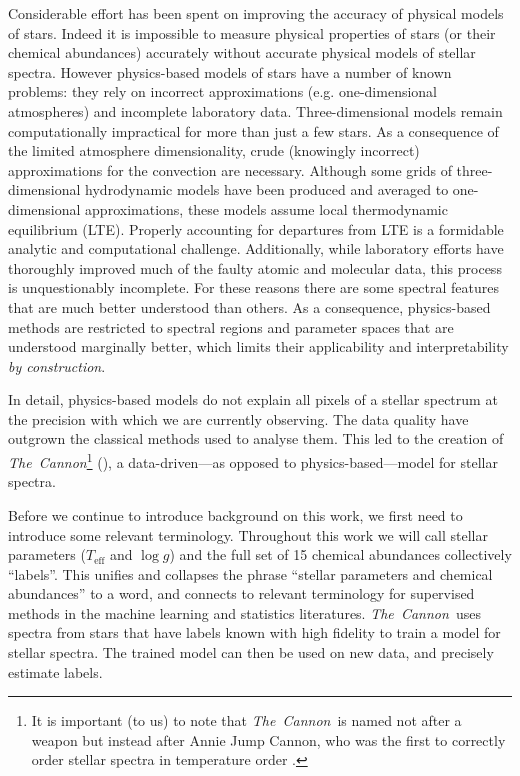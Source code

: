 \documentclass[12pt,preprint]{aastex}
\newcommand{\project}[1]{\textsl{#1}}
\newcommand{\TheCannon}{\project{The~Cannon}}
\newcommand{\logg}{\log g}
\newcommand{\Teff}{T_{\mathrm{eff}}}
\begin{document}
Considerable effort has  been spent on improving the accuracy of physical
models of stars.  Indeed it is impossible to measure physical properties of stars (or 
their chemical abundances) accurately without accurate physical models of 
stellar spectra.  However physics-based models of stars have a number of known
problems: they rely on incorrect approximations (e.g. one-dimensional atmospheres) and incomplete laboratory data.
Three-dimensional models remain computationally impractical for more than just a
few stars.  As a consequence of the limited atmosphere dimensionality, crude 
(knowingly incorrect) approximations for the convection are 
necessary.  Although some grids of three-dimensional hydrodynamic models have been 
produced and averaged to one-dimensional approximations, these models assume 
local thermodynamic equilibrium (LTE).  Properly accounting for departures from 
LTE is a formidable analytic and computational challenge.  Additionally, while 
laboratory efforts have thoroughly improved much of the faulty atomic and 
molecular data, this process is unquestionably incomplete.  For these reasons 
there are some spectral features that are much better understood than others.  
As a consequence, physics-based methods are restricted to spectral regions and
parameter spaces that are understood marginally better, which limits 
their applicability and interpretability \emph{by construction}.


In detail, physics-based models do not explain all pixels of a stellar 
spectrum at the precision with which we are currently observing.  The data
quality have outgrown the classical methods used to analyse them.  This led to the creation of
\TheCannon\footnote{It is important (to us) to note that \TheCannon\ is named 
not after a weapon but instead after Annie Jump Cannon, who was the first to 
correctly order stellar spectra in temperature order \citep[and who did
so by looking at the data, and without any use of physics-based models, see, e.g.,][]
{Cannon_1912}.} (\citealt{tc}), a data-driven---as opposed to 
physics-based---model for stellar spectra. 


Before we continue to introduce background on this work, we first need to
introduce some relevant terminology.  Throughout this work we will call stellar 
parameters ($\Teff$ and $\logg$) and the full set of 15 chemical abundances 
collectively ``labels''.  This unifies and collapses the phrase ``stellar
parameters and chemical abundances'' to a word, and connects to relevant 
terminology for supervised methods in the machine learning and statistics 
literatures.  \TheCannon\ uses spectra from stars that have labels known
with high fidelity to train a model for stellar spectra.  The trained model can
then be used on new data, and precisely estimate labels.
\end{document}
